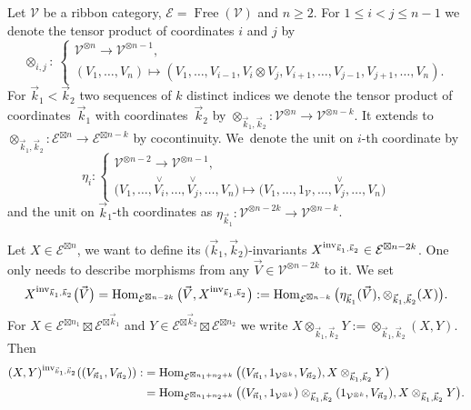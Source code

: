 \documentclass[pdftex]{sigma}%
\numberwithin{equation}{section}
\newcommand{\Free}{\operatorname{Free}}
\newcommand{\Hom}{\operatorname{Hom}}
\begin{document}
\begin{Definition} \label{defInvRibCat}
Let $\mathcal{V}$ be a ribbon category, $\mathcal{E} = \Free(\mathcal{V})$ and $n \geq 2$. For $1\leq i <j \leq n-1$ we denote the tensor product of coordinates $i$ and $j$ by
\[
\otimes_{i,j}\colon\ \begin{cases}
\mathcal{V}^{\otimes n}  \to  \mathcal{V}^{\otimes n-1},
\\
(V_1,\dots,V_n)  \mapsto  (V_1,\dots, V_{i-1}, V_i \otimes V_j, V_{i+1},\dots, V_{j-1},V_{j+1},\dots,V_n).\end{cases}
\]
For $\vec{k}_1<\vec{k}_2$ two sequences of $k$ distinct indices we denote the tensor product of coordinates~$\vec{k}_1$ with coordinates~$\vec{k}_2$ by $\otimes_{\vec{k}_1,\vec{k}_2} \colon \mathcal{V}^{\otimes n}\to \mathcal{V}^{\otimes n-k}$. It extends to $\otimes_{\vec{k}_1,\vec{k}_2}\colon \mathcal{E}^{\boxtimes n} \to \mathcal{E}^{\boxtimes n-k}$ by cocontinuity.
We~denote the unit on $i$-th coordinate by
\[
\eta_i \colon \begin{cases}
\mathcal{V}^{\otimes n-2} \to \mathcal{V}^{\otimes n-1},
\\
\big(V_1,\dots, \overset{\vee}{V_i},\dots, \overset{\vee}{V_j},\dots,V_n\big) \mapsto\big(V_1,\dots,1_\mathcal{V},\dots,\overset{\vee}{V_j},\dots,V_n\big)
\end{cases}
\]
and the unit on $\vec{k}_1$-th coordinates as $\eta_{\vec{k}_1}\colon \mathcal{V}^{\otimes n-2k}\to \mathcal{V}^{\otimes n-k}$.

Let $X \in \mathcal{E}^{\boxtimes n}$, we want to define its $\big(\vec{k}_1,\vec{k}_2\big)$-invariants $X^{{\rm inv}_{\vec{k}_1,\vec{k}_2}} \in \mathcal{E}^{\boxtimes n-2k}$. One only needs to describe morphisms from any $\vec{V} \in \mathcal{V}^{\otimes n-2k}$ to it. We set
\[
X^{{\rm inv}_{\vec{k}_1,\vec{k}_2}}\big(\vec{V}\big) = \Hom_{\mathcal{E}^{\boxtimes n-2k}}\big(\vec{V},X^{{\rm inv}_{\vec{k}_1,\vec{k}_2}}\big) := \Hom_{\mathcal{E}^{\boxtimes n-k}}\big(\eta_{\vec{k}_1}(\vec{V}),\otimes_{\vec{k}_1,\vec{k}_2}(X)\big).
\]
 For $X \in \mathcal{E}^{\boxtimes n_1}\boxtimes \mathcal{E}^{\boxtimes \vec{k}_1}$ and $Y \in \mathcal{E}^{\boxtimes \vec{k}_2}\boxtimes \mathcal{E}^{\boxtimes n_2}$ we write $X \otimes_{\vec{k}_1,\vec{k}_2} Y := \otimes_{\vec{k}_1,\vec{k}_2}(X,Y)$. Then
 \begin{align*}
(X,Y)^{{\rm inv}_{\vec{k}_1,\vec{k}_2}}((V_{\vec{n}_1},V_{\vec{n}_2})) :&= \Hom_{\mathcal{E}^{\boxtimes n_1+n_2+k}}\big((V_{\vec{n}_1},1_{\mathcal{V}^{\otimes k}},V_{\vec{n}_2}),X\otimes_{\vec{k}_1,\vec{k}_2}Y\big)
\\
&= \Hom_{\mathcal{E}^{\boxtimes n_1+n_2+k}}\big((V_{\vec{n}_1},1_{\mathcal{V}^{\otimes k}})\otimes_{\vec{k}_1,\vec{k}_2}(1_{\mathcal{V}^{\otimes k}} ,V_{\vec{n}_2}),X\otimes_{\vec{k}_1,\vec{k}_2}Y\big).
 \end{align*}
\end{Definition}
\end{document}

